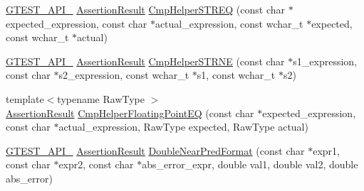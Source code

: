 \begin{DoxyCompactItemize}
\item 
\hyperlink{ts__gtest_8h_aa73be6f0ba4a7456180a94904ce17790}{G\-T\-E\-S\-T\-\_\-\-A\-P\-I\-\_\-} \hyperlink{classtesting_1_1AssertionResult}{Assertion\-Result} \hyperlink{namespacetesting_1_1internal_ae4a6a76bd9be0d1d20b35bac9fe4eb71}{Cmp\-Helper\-S\-T\-R\-E\-Q} (const char $\ast$expected\-\_\-expression, const char $\ast$actual\-\_\-expression, const wchar\-\_\-t $\ast$expected, const wchar\-\_\-t $\ast$actual)
\item 
\hyperlink{ts__gtest_8h_aa73be6f0ba4a7456180a94904ce17790}{G\-T\-E\-S\-T\-\_\-\-A\-P\-I\-\_\-} \hyperlink{classtesting_1_1AssertionResult}{Assertion\-Result} \hyperlink{namespacetesting_1_1internal_a6e700804399b6694d8d6157e3a141b17}{Cmp\-Helper\-S\-T\-R\-N\-E} (const char $\ast$s1\-\_\-expression, const char $\ast$s2\-\_\-expression, const wchar\-\_\-t $\ast$s1, const wchar\-\_\-t $\ast$s2)
\item 
{\footnotesize template$<$typename Raw\-Type $>$ }\\\hyperlink{classtesting_1_1AssertionResult}{Assertion\-Result} \hyperlink{namespacetesting_1_1internal_aaf581f35dfe9f1a3705f99b455a18abd}{Cmp\-Helper\-Floating\-Point\-E\-Q} (const char $\ast$expected\-\_\-expression, const char $\ast$actual\-\_\-expression, Raw\-Type expected, Raw\-Type actual)
\item 
\hyperlink{ts__gtest_8h_aa73be6f0ba4a7456180a94904ce17790}{G\-T\-E\-S\-T\-\_\-\-A\-P\-I\-\_\-} \hyperlink{classtesting_1_1AssertionResult}{Assertion\-Result} \hyperlink{namespacetesting_1_1internal_aea60207c4cedc8946a70ada62e38da8f}{Double\-Near\-Pred\-Format} (const char $\ast$expr1, const char $\ast$expr2, const char $\ast$abs\-\_\-error\-\_\-expr, double val1, double val2, double abs\-\_\-error)
\end{DoxyCompactItemize}
